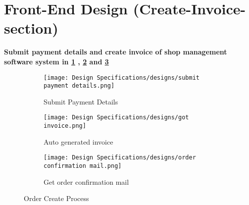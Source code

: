 \section{Front-End Design (Create-Invoice-section)}
\vspace{0.2cm}
\textbf{Submit payment details and create invoice of shop management software system in \ref{fig:fig 5.3.1} , \ref{fig:fig 5.3.2} and \ref{fig:fig 5.3.3}}\\
\begin{figure}[ht]
    \centering
    \begin{subfigure}{\textwidth}
        \centering  
        \texttt{[image: Design Specifications/designs/submit payment details.png]}    
        \caption{Submit Payment Details}
        \label{fig:fig 5.3.1}
    \end{subfigure}
    
    \begin{subfigure}{\textwidth}
        \centering  
        \texttt{[image: Design Specifications/designs/got invoice.png]}    
        \caption{Auto generated invoice}
        \label{fig:fig 5.3.2}
    \end{subfigure}

    \begin{subfigure}{\textwidth}
        \centering  
        \texttt{[image: Design Specifications/designs/order confirmation mail.png]}    
        \caption{Get order confirmation mail}
        \label{fig:fig 5.3.3}
    \end{subfigure}
    
    \caption{Order Create Process}
    \label{fig: 5.3}
\end{figure}